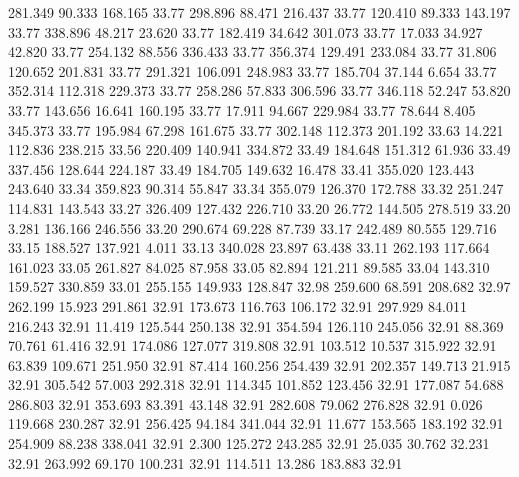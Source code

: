  281.349   90.333  168.165        33.77
 298.896   88.471  216.437        33.77
 120.410   89.333  143.197        33.77
 338.896   48.217   23.620        33.77
 182.419   34.642  301.073        33.77
  17.033   34.927   42.820        33.77
 254.132   88.556  336.433        33.77
 356.374  129.491  233.084        33.77
  31.806  120.652  201.831        33.77
 291.321  106.091  248.983        33.77
 185.704   37.144    6.654        33.77
 352.314  112.318  229.373        33.77
 258.286   57.833  306.596        33.77
 346.118   52.247   53.820        33.77
 143.656   16.641  160.195        33.77
  17.911   94.667  229.984        33.77
  78.644    8.405  345.373        33.77
 195.984   67.298  161.675        33.77
 302.148  112.373  201.192        33.63
  14.221  112.836  238.215        33.56
 220.409  140.941  334.872        33.49
 184.648  151.312   61.936        33.49
 337.456  128.644  224.187        33.49
 184.705  149.632   16.478        33.41
 355.020  123.443  243.640        33.34
 359.823   90.314   55.847        33.34
 355.079  126.370  172.788        33.32
 251.247  114.831  143.543        33.27
 326.409  127.432  226.710        33.20
  26.772  144.505  278.519        33.20
   3.281  136.166  246.556        33.20
 290.674   69.228   87.739        33.17
 242.489   80.555  129.716        33.15
 188.527  137.921    4.011        33.13
 340.028   23.897   63.438        33.11
 262.193  117.664  161.023        33.05
 261.827   84.025   87.958        33.05
  82.894  121.211   89.585        33.04
 143.310  159.527  330.859        33.01
 255.155  149.933  128.847        32.98
 259.600   68.591  208.682        32.97
 262.199   15.923  291.861        32.91
 173.673  116.763  106.172        32.91
 297.929   84.011  216.243        32.91
  11.419  125.544  250.138        32.91
 354.594  126.110  245.056        32.91
  88.369   70.761   61.416        32.91
 174.086  127.077  319.808        32.91
 103.512   10.537  315.922        32.91
  63.839  109.671  251.950        32.91
  87.414  160.256  254.439        32.91
 202.357  149.713   21.915        32.91
 305.542   57.003  292.318        32.91
 114.345  101.852  123.456        32.91
 177.087   54.688  286.803        32.91
 353.693   83.391   43.148        32.91
 282.608   79.062  276.828        32.91
   0.026  119.668  230.287        32.91
 256.425   94.184  341.044        32.91
  11.677  153.565  183.192        32.91
 254.909   88.238  338.041        32.91
   2.300  125.272  243.285        32.91
  25.035   30.762   32.231        32.91
 263.992   69.170  100.231        32.91
 114.511   13.286  183.883        32.91
